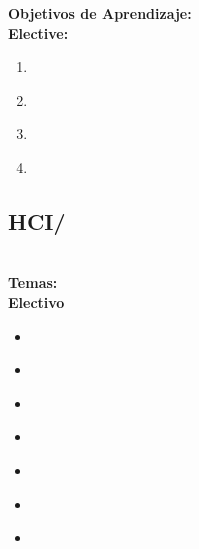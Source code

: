 \noindent \textbf{Objetivos de Aprendizaje:}\\
\noindent \textbf{Elective:}
\begin{enumerate}
	\setcounter{enumi}{0}
	\item \HCICollaborationandcommunicationLODescribeTheSynchronous\xspace[\HCICollaborationandcommunicationLODescribeTheSynchronousLevel]\label{sec:BOK:HCICollaborationandcommunicationLODescribeTheSynchronous}
	\item \HCICollaborationandcommunicationLOCompareTheIn\xspace[\HCICollaborationandcommunicationLOCompareTheInLevel]\label{sec:BOK:HCICollaborationandcommunicationLOCompareTheIn}
	\item \HCICollaborationandcommunicationLODiscussSeveral\xspace[\HCICollaborationandcommunicationLODiscussSeveralLevel]\label{sec:BOK:HCICollaborationandcommunicationLODiscussSeveral}
	\item \HCICollaborationandcommunicationLODiscussTheIn\xspace[\HCICollaborationandcommunicationLODiscussTheInLevel]\label{sec:BOK:HCICollaborationandcommunicationLODiscussTheIn}
\end{enumerate}


\subsection{HCI/\HCIStatisticalmethodsforHCI}\label{sec:BOK:HCIStatisticalmethodsforHCI}
\HCIStatisticalmethodsforHCIDescription\\
\noindent \textbf{Temas:}\\
\noindent \textbf{Electivo}
\begin{itemize}
	\item \HCIStatisticalmethodsforHCITopicT\label{sec:BOK:HCIStatisticalmethodsforHCITopicT}
	\item \HCIStatisticalmethodsforHCITopicAnova\label{sec:BOK:HCIStatisticalmethodsforHCITopicAnova}
	\item \HCIStatisticalmethodsforHCITopicRandomization\label{sec:BOK:HCIStatisticalmethodsforHCITopicRandomization}
	\item \HCIStatisticalmethodsforHCITopicCalculating\label{sec:BOK:HCIStatisticalmethodsforHCITopicCalculating}
	\item \HCIStatisticalmethodsforHCITopicExploratory\label{sec:BOK:HCIStatisticalmethodsforHCITopicExploratory}
	\item \HCIStatisticalmethodsforHCITopicPresenting\label{sec:BOK:HCIStatisticalmethodsforHCITopicPresenting}
	\item \HCIStatisticalmethodsforHCITopicCombining\label{sec:BOK:HCIStatisticalmethodsforHCITopicCombining}
\end{itemize}


